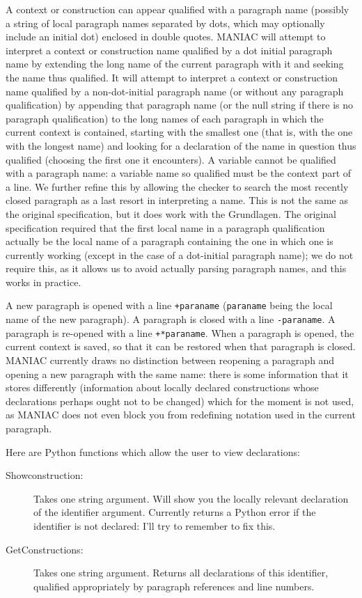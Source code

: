 \documentclass[12pt]{article}
\begin{document}
A context or construction can appear qualified with a paragraph name (possibly a string of local paragraph names separated by dots, which may optionally include an initial dot) enclosed in double quotes.  MANIAC will attempt to interpret a context or construction name qualified by a dot initial paragraph name by extending the long name of the current paragraph with it and seeking the name thus qualified.  It will attempt to interpret a context or construction name qualified by a non-dot-initial paragraph name  (or without any paragraph qualification) by appending that paragraph name (or the null string if there is no paragraph qualification) to the long names of each paragraph in which the current context is contained, starting with the smallest one (that is, with the one with the longest name) and looking for a declaration of the name in question thus qualified (choosing the first one it encounters).  A variable cannot be qualified with a paragraph name:
a variable name so qualified must be the context part of a line.  We further refine this by allowing the checker to search the most recently closed paragraph as a last resort
in interpreting a name.  This is not the same as the original specification, but it does work with the Grundlagen.  The original specification required that the first local name
in a paragraph qualification actually be the local name of a paragraph containing the one  in which one is currently working (except in the case of a dot-initial paragraph name);  we do not require this, as it allows us to avoid actually parsing paragraph names, and this works in practice.

A new paragraph is opened with a line {\tt +paraname} ({\tt paraname} being the local name of the new paragraph).  A paragraph is closed with a line {\tt -paraname}.  A paragraph is re-opened with a line {\tt +*paraname}.  When a paragraph is opened, the current context is saved, so that it can be restored when that paragraph is closed.   MANIAC currently draws no distinction between reopening a paragraph and opening a new paragraph with the same name:  there is some information that it stores differently (information about locally declared constructions whose declarations perhaps ought not to be changed) which for the moment is not used, as MANIAC does not even block you from redefining notation used in the current paragraph.

Here are Python functions which allow the user to view declarations:

\begin{description}

\item[Showconstruction:]  Takes one string argument.  Will show you the locally relevant declaration of the identifier argument.  Currently returns a Python error if the identifier is not declared:  I'll try to remember to fix this.

\item[GetConstructions:]  Takes one string argument.  Returns all declarations of this identifier, qualified appropriately by paragraph references and line numbers.

\end{description}
\end{document}
